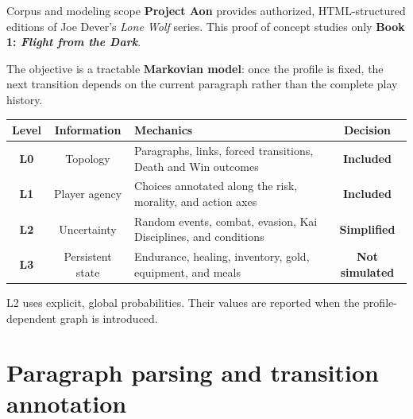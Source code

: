 \documentclass{beamer}
\newcommand{\imp}[1]{\textbf{\color{cyan}#1}}
\begin{document}
  	\begin{frame}{Corpus and modeling scope}
  		\footnotesize
  		\imp{Project Aon} provides authorized, HTML-structured editions of Joe
  		Dever's \emph{Lone Wolf} series. This proof of concept studies only
  		\imp{Book 1: \emph{Flight from the Dark}}.
  		
  		\vspace{0.2cm}
  		
  		The objective is a tractable \imp{Markovian model}: once the profile is
  		fixed, the next transition depends on the current paragraph rather than
  		the complete play history.
  		
  		\vspace{0.25cm}
  		
  		\begin{center}
  			\tiny
  			\begin{tabular}{|c|c|p{}|c|}
  				\hline
  				\textbf{Level} & \textbf{Information} & \textbf{Mechanics} &
  				\textbf{Decision} \\
  				\hline
  				\textbf{L0} & Topology &
  				Paragraphs, links, forced transitions, Death and Win outcomes &
  				\textcolor{green!50!black}{\textbf{Included}} \\
  				\hline
  				\textbf{L1} & Player agency &
  				Choices annotated along the risk, morality, and action axes &
  				\textcolor{green!50!black}{\textbf{Included}} \\
  				\hline
  				\textbf{L2} & Uncertainty &
  				Random events, combat, evasion, Kai Disciplines, and conditions &
  				\textcolor{orange!80!black}{\textbf{Simplified}} \\
  				\hline
  				\textbf{L3} & Persistent state &
  				Endurance, healing, inventory, gold, equipment, and meals &
  				\textcolor{red!75!black}{\textbf{Not simulated}} \\
  				\hline
  			\end{tabular}
  		\end{center}
  		
  		\scriptsize
  		L2 uses explicit, global probabilities. Their values are reported when
  		the profile-dependent graph is introduced.
  	\end{frame}
  	
  	
  	\section{Paragraph parsing and transition annotation}
  	
\end{document}
